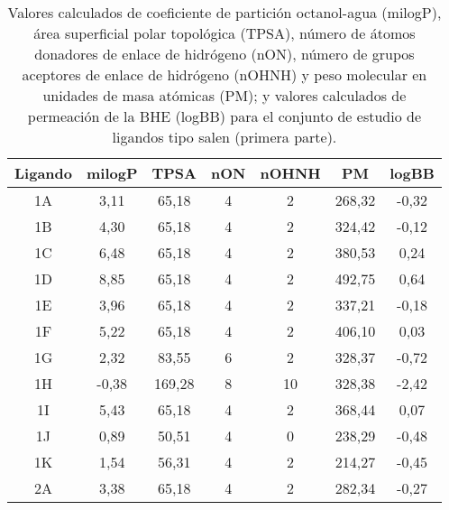 \begin{table}[h]
\centering
\caption{Valores calculados de coeficiente de partición octanol-agua (milogP), área superficial polar topológica (TPSA), número de átomos donadores de enlace de hidrógeno (nON), número de grupos aceptores de enlace de hidrógeno (nOHNH) y peso molecular en unidades de masa atómicas (PM); y valores calculados de permeación de la BHE (logBB) para el conjunto de estudio de ligandos tipo salen (primera parte).}
\begin{tabular}{c|ccccc|c}
\hline
\textbf{Ligando} & \textbf{milogP} & \textbf{TPSA} & \textbf{nON} & \textbf{nOHNH} & \textbf{PM} & \textbf{logBB} \\ \hline
1A               & 3,11             & 65,18         & 4            & 2              & 268,32      & -0,32          \\
1B               & 4,30             & 65,18         & 4            & 2              & 324,42      & -0,12          \\
1C               & 6,48             & 65,18         & 4            & 2              & 380,53      & 0,24           \\
1D               & 8,85             & 65,18         & 4            & 2              & 492,75      & 0,64           \\
1E               & 3,96             & 65,18         & 4            & 2              & 337,21      & -0,18          \\
1F               & 5,22             & 65,18         & 4            & 2              & 406,10      & 0,03           \\
1G               & 2,32             & 83,55         & 6            & 2              & 328,37      & -0,72          \\
1H               & -0,38            & 169,28        & 8            & 10             & 328,38      & -2,42          \\
1I               & 5,43             & 65,18         & 4            & 2              & 368,44      & 0,07           \\
1J               & 0,89             & 50,51         & 4            & 0              & 238,29      & -0,48          \\
1K               & 1,54             & 56,31         & 4            & 2              & 214,27      & -0,45          \\
2A               & 3,38             & 65,18         & 4            & 2              & 282,34      & -0,27          \\

\end{tabular}
\end{table}
